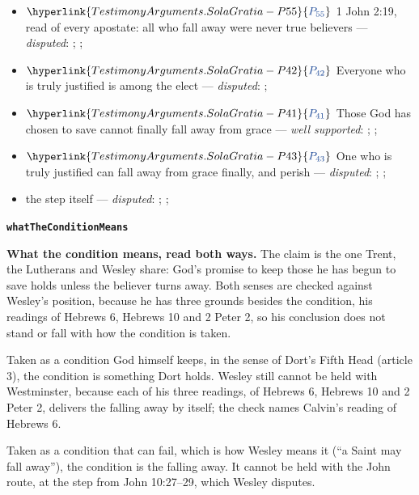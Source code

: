 \documentclass[11pt]{article}
\newcommand{\pvar}[2]{\hyperlink{#1-P#2}{\textcolor{claimlink}{P_{#2}}}}
\begin{document}
\begin{itemize}
\begin{itemize}
\item \(\pvar{TestimonyArguments.SolaGratia}{55}\) 1 John 2:19, read of every apostate: all who fall away were never true believers --- \emph{disputed}: \cite[594--595]{owen-works-11-perseverance}; \cite[191--192]{calvin-commentaries-catholic-epistles}; \cite[479--480]{npnf1-05-1887}
\item \(\pvar{TestimonyArguments.SolaGratia}{42}\) Everyone who is truly justified is among the elect --- \emph{disputed}: \cite[X.4]{westminster-confession-1647}; \cite[137--138]{calvin-hebrews-1853}
\item \(\pvar{TestimonyArguments.SolaGratia}{41}\) Those God has chosen to save cannot finally fall away from grace --- \emph{well supported}: \cite[XVII.1]{westminster-confession-1647}; \cite[636]{schaff-creeds-christendom-3-1977}; \cite[593]{schaff-creeds-christendom-3-1977}
\item \(\pvar{TestimonyArguments.SolaGratia}{43}\) One who is truly justified can fall away from grace finally, and perish --- \emph{disputed}: \cite[Trent, Session VI (1547), canon 23]{tanner-decrees-1990}; \cite[47]{waterworth-trent-1848}; \cite[439]{wesley-works-9-1827}
\item the step itself --- \emph{disputed}: \cite[444--445]{wesley-works-9-1827}; \cite[415--416]{calvin-commentary-john-1847}; \cite[Solid Declaration XI.45]{concordia-triglotta-1921}
\end{itemize}
\end{itemize}
\par\medskip\noindent\textbf{\texttt{what\allowbreak{}The\allowbreak{}Condition\allowbreak{}Means}}\par\nobreak\noindent
\textbf{What the condition means, read both ways.} The claim is the one Trent, the Lutherans and Wesley share: God’s promise to keep those he has begun to save holds unless the believer turns away. Both senses are checked against Wesley’s position, because he has three grounds besides the condition, his readings of Hebrews 6, Hebrews 10 and 2 Peter 2, so his conclusion does not stand or fall with how the condition is taken.

Taken as a condition God himself keeps, in the sense of Dort’s Fifth Head (article 3), the condition is something Dort holds. Wesley still cannot be held with Westminster, because each of his three readings, of Hebrews 6, Hebrews 10 and 2 Peter 2, delivers the falling away by itself; the check names Calvin’s reading of Hebrews 6.

Taken as a condition that can fail, which is how Wesley means it (“a Saint may fall away”), the condition is the falling away. It cannot be held with the John route, at the step from John 10:27–29, which Wesley disputes.
\end{document}
